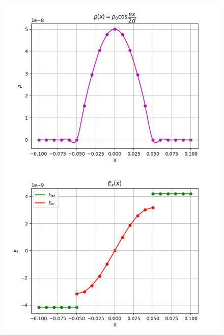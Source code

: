 \documentclass[a4paper,12pt]{article}
\begin{document}
	\begin{figure}[h!]
		\centering
		\begin{minipage}[h]{0.55\linewidth}
			\includegraphics[width=1\linewidth]{Prt sc/Figure_1.jpeg} 
		\end{minipage}

		\begin{minipage}[h]{0.55\linewidth}
			\includegraphics[width=1\linewidth]{Prt sc/Figure_2.jpeg}
		\end{minipage}


\end{figure}
\end{document}

